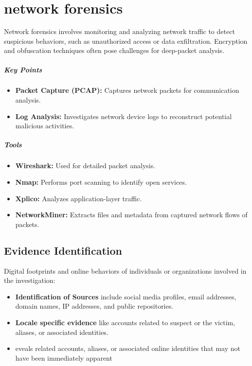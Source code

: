 \chapter{network forensics}

Network forensics involves monitoring and analyzing network traffic to detect suspicious behaviors, such as unauthorized access or data exfiltration. Encryption and obfuscation techniques often pose challenges for deep-packet analysis.

\paragraph{Key Points}
\begin{itemize}
    \item \textbf{Packet Capture (PCAP):} Captures network packets for communication analysis.
    \item \textbf{Log Analysis:} Investigates network device logs to reconstruct potential malicious activities.
\end{itemize}

\paragraph{Tools}
\begin{itemize}
    \item \textbf{Wireshark:} Used for detailed packet analysis.
    \item \textbf{Nmap:} Performs port scanning to identify open services.
    \item \textbf{Xplico:} Analyzes application-layer traffic.
    \item \textbf{NetworkMiner:} Extracts files and metadata from captured network flows of packets.
\end{itemize}

\section{Evidence Identification}
Digital footprints and online behaviors of individuals or organizations involved in the investigation:
\begin{itemize}
    \item \textbf{Identification of Sources} include social media profiles, email addresses, domain names, IP addresses, and public repositories.
    \item \textbf{Locale specific evidence} like accounts related to suspect or the victim, aliases, or associated identities.
    \item eveals related accounts, aliases, or associated online identities that may not have been immediately apparent
\end{itemize}

